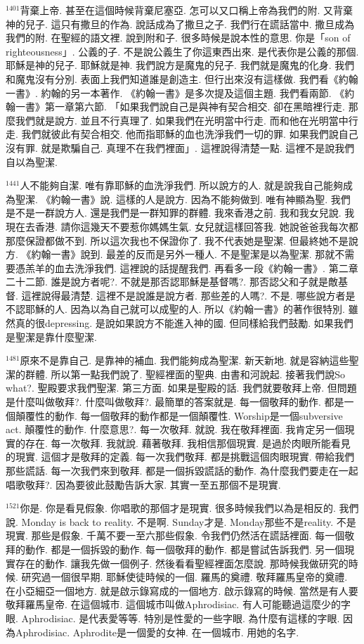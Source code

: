 \documentclass{book}
\begin{document}
$^{1401}$背棄上帝.
甚至在這個時候背棄尼塞亞.
怎可以又口稱上帝為我們的附.
又背棄神的兒子.
這只有撒旦的作為.
說話成為了撒旦之子.
我們行在謊話當中.
撒旦成為我們的附.
在聖經的語文裡.
說到附和子.
很多時候是說本性的意思.
你是「son of righteousness」.
公義的子.
不是說公義生了你這東西出來.
是代表你是公義的那個.
耶穌是神的兒子.
耶穌就是神.
我們說方是魔鬼的兒子.
我們就是魔鬼的化身.
我們和魔鬼沒有分別.
表面上我們知道誰是創造主.
但行出來沒有這樣做.
我們看《約翰一書》.
約翰的另一本著作.
《約翰一書》是多次提及這個主題.
我們看兩節.
《約翰一書》第一章第六節.
「如果我們說自己是與神有契合相交.
卻在黑暗裡行走.
那麼我們就是說方.
並且不行真理了.
如果我們在光明當中行走.
而和他在光明當中行走.
我們就彼此有契合相交.
他而指耶穌的血也洗淨我們一切的罪.
如果我們說自己沒有罪.
就是欺騙自己.
真理不在我們裡面」.
這裡說得清楚一點.
這裡不是說我們自以為聖潔.

$^{1441}$人不能夠自潔.
唯有靠耶穌的血洗淨我們.
所以說方的人.
就是說我自己能夠成為聖潔.
《約翰一書》說.
這樣的人是說方.
因為不能夠做到.
唯有神顯為聖.
我們是不是一群說方人.
還是我們是一群知罪的群體.
我來香港之前.
我和我女兒說.
我現在去香港.
請你這幾天不要惹你媽媽生氣.
女兒就這樣回答我.
她說爸爸我每次都那麼保證都做不到.
所以這次我也不保證你了.
我不代表她是聖潔.
但最終她不是說方.
《約翰一書》說到.
最差的反而是另外一種人.
不是聖潔是以為聖潔.
那就不需要憑羔羊的血去洗淨我們.
這裡說的話提醒我們.
再看多一段《約翰一書》.
第二章二十二節.
誰是說方者呢?.
不就是那否認耶穌是基督嗎?.
那否認父和子就是敵基督.
這裡說得最清楚.
這裡不是說誰是說方者.
那些差的人嗎?.
不是.
哪些說方者是不認耶穌的人.
因為以為自己就可以成聖的人.
所以《約翰一書》的著作很特別.
雖然真的很depressing.
是說如果說方不能進入神的國.
但同樣給我們鼓勵.
如果我們是聖潔是靠什麼聖潔.

$^{1481}$原來不是靠自己.
是靠神的補血.
我們能夠成為聖潔.
新天新地.
就是容納這些聖潔的群體.
所以第一點我們說了.
聖經裡面的聖典.
由書和河說起.
接著我們說So what?.
聖殿要求我們聖潔.
第三方面.
如果是聖殿的話.
我們就要敬拜上帝.
但問題是什麼叫做敬拜?.
什麼叫做敬拜?.
最簡單的答案就是.
每一個敬拜的動作.
都是一個顛覆性的動作.
每一個敬拜的動作都是一個顛覆性.
Worship是一個subversive act.
顛覆性的動作.
什麼意思?.
每一次敬拜.
就說.
我在敬拜裡面.
我肯定另一個現實的存在.
每一次敬拜.
我就說.
藉著敬拜.
我相信那個現實.
是過於肉眼所能看見的現實.
這個才是敬拜的定義.
每一次我們敬拜.
都是挑戰這個肉眼現實.
帶給我們那些謊話.
每一次我們來到敬拜.
都是一個拆毀謊話的動作.
為什麼我們要走在一起唱歌敬拜?.
因為要彼此鼓勵告訴大家.
其實一至五那個不是現實.

$^{1521}$你是.
你是看見假象.
你唱歌的那個才是現實.
很多時候我們以為是相反的.
我們說.
Monday is back to reality.
不是啊.
Sunday才是.
Monday那些不是reality.
不是現實.
那些是假象.
千萬不要一至六那些假象.
令我們仍然活在謊話裡面.
每一個敬拜的動作.
都是一個拆毀的動作.
每一個敬拜的動作.
都是嘗試告訴我們.
另一個現實存在的動作.
讓我先做一個例子.
然後看看聖經裡面怎麼說.
那時候我做研究的時候.
研究過一個很早期.
耶穌使徒時候的一個.
羅馬的奠禮.
敬拜羅馬皇帝的奠禮.
在小亞細亞一個地方.
就是啟示錄寫成的一個地方.
啟示錄寫的時候.
當然是有人要敬拜羅馬皇帝.
在這個城市.
這個城市叫做Aphrodisiac.
有人可能聽過這麼少的字眼.
Aphrodisiac.
是代表愛等等.
特別是性愛的一些字眼.
為什麼有這樣的字眼.
因為Aphrodisiac.
Aphrodite是一個愛的女神.
在一個城市.
用她的名字.
\end{document}
